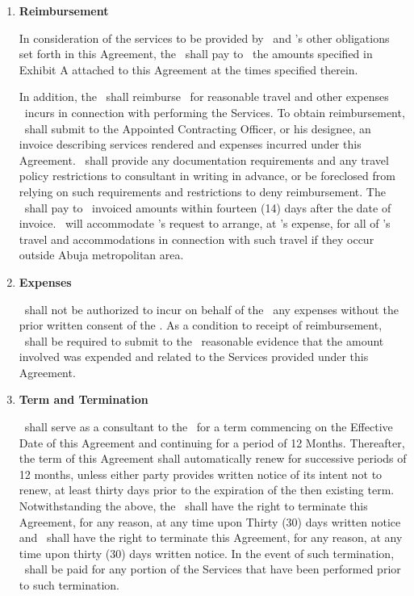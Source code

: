 \documentclass[a4paper,10pt,notitlepage,twocolumn]{article}
\begin{document}
\begin{enumerate}
\item  \textbf{Reimbursement}

In consideration of the services to be provided by \cntrref\ and \cntrref 's other obligations set forth in this Agreement, the \clref\ shall pay to \cntrref\ the amounts specified in Exhibit A attached to this Agreement at the times specified therein.

In addition, the \clref\ shall reimburse \cntrref\ for reasonable travel and other expenses \cntrref\ incurs in connection with performing the Services. To obtain reimbursement, \cntrref\ shall submit to the Appointed Contracting Officer, or his designee, an invoice describing services rendered and expenses incurred under this Agreement.  \clref\ shall provide any documentation requirements and any travel policy restrictions to consultant in writing in advance, or be foreclosed from relying on such requirements and restrictions to deny reimbursement.  The \clref\ shall pay to \cntrref\ invoiced amounts within fourteen (14) days after the date of invoice.  \clref\ will accommodate \cntrref 's request to arrange, at \clref 's expense, for all of \cntrref 's travel and accommodations in connection with such travel if they occur outside Abuja metropolitan area.

\medskip
 \item \textbf{Expenses}
 
\cntrref\ shall not be authorized to incur on behalf of the \clref\ any expenses without the prior written consent of the \clref .  As a condition to receipt of reimbursement, \cntrref\ shall be required to submit to the \clref\ reasonable evidence that the amount involved was expended and related to the Services provided under this Agreement.



\item  \textbf{Term and Termination}
 
\cntrref\ shall serve as a consultant to the \clref\ for a term commencing on the Effective Date of this Agreement and continuing for a period of 12 Months.  Thereafter, the term of this Agreement shall automatically renew for successive periods of 12 months, unless either party provides written notice of its intent not to renew, at least thirty days prior to the expiration of the then existing term.  Notwithstanding the above, the \clref\ shall have the right to terminate this Agreement, for any reason, at any time upon Thirty (30) days written notice and \cntrref\ shall have the right to terminate this Agreement, for any reason, at any time upon thirty (30) days written notice.  In the event of such termination, \cntrref\ shall be paid for any portion of the Services that have been performed prior to such termination.



\end{enumerate}
\end{document}
